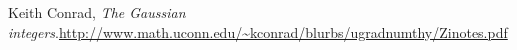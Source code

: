 \documentclass[paper=a4, fontsize=12pt]{scrartcl} %
\theoremstyle{plainsl}
\theoremstyle{definition}
\theoremstyle{remark}
\begin{document}
\begin{thebibliography}{99999999}                                                                                         %






Keith Conrad, \textit{The Gaussian
integers}.\newline\url{http://www.math.uconn.edu/~kconrad/blurbs/ugradnumthy/Zinotes.pdf}

\end{thebibliography}
\end{document}
